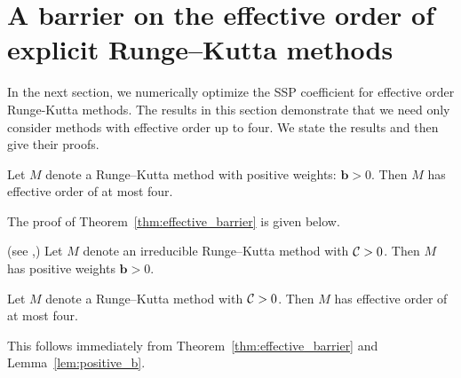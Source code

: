 \section{A barrier on the effective order of explicit Runge--Kutta methods}\label{sec:ExRK_barrier}
In the next section, we numerically optimize the SSP coefficient for effective 
order Runge-Kutta methods.
The results in this section demonstrate that we need only consider methods 
with effective order up to four. 
We state the results and then give their proofs.


\begin{theorem}\label{thm:effective_barrier}
	Let $M$ denote a Runge--Kutta method with positive weights: $\bm{b}>0$.
    Then $M$ has effective order of at most four.
\end{theorem}
The proof of Theorem~\ref{thm:effective_barrier} is given below.

\begin{lemma}\label{lem:positive_b}(see \cite[Theorem~4.2]{Kraaijevanger1991},\cite[Lemma 4.2]{Ruuth2002})
	Let $M$ denote an irreducible Runge--Kutta method with $\mathcal{C}>0$. 
	Then $M$ has positive weights $\bm{b}>0$.
\end{lemma}

\begin{corollary}\label{cor:no_SSP_5}
	Let $M$ denote a Runge--Kutta method with $\mathcal{C}>0$.
    Then $M$ has effective order of at most four.
\end{corollary}
This follows immediately from Theorem~\ref{thm:effective_barrier} and 
Lemma~\ref{lem:positive_b}.

